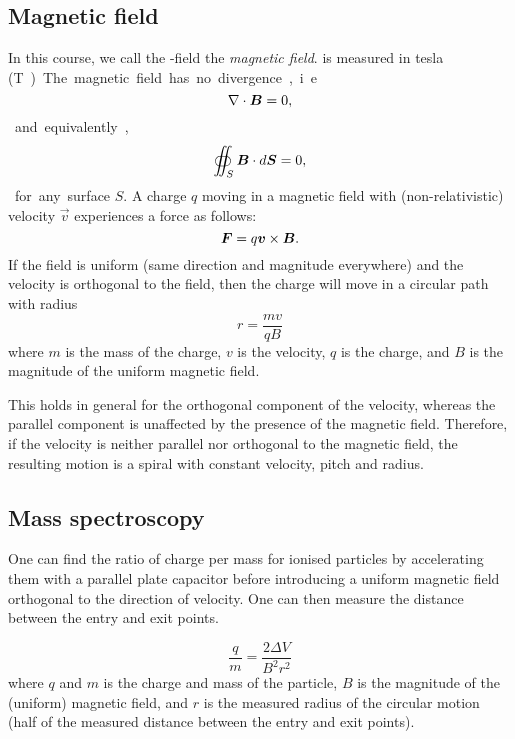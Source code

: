 \subsection{Magnetic field}
    In this course, we call the \B-field the \textit{magnetic field}. \B{} is measured in tesla (\si\tesla).
    
    The magnetic field has no divergence, i.e.
    \begin{equation}
        \nabla \cdot \bm{B} = 0,
    \end{equation}
    and equivalently,
    \begin{equation}
        \label{flux of B}
        \oiint_S \bm{B}\cdot d\bm{S} = 0,
    \end{equation}
    for any surface $S$.
    A charge $q$ moving in a magnetic field with (non-relativistic) velocity $\vec{v}$ experiences a force as follows: 
    \begin{equation}
        \bm{F} = q\bm{v}\times \bm{B}.
    \end{equation}
    If the field is uniform (same direction and magnitude everywhere) and the velocity is orthogonal to the field, 
    then the charge will move in a circular path with radius
    \begin{equation}
        r = \frac{mv}{qB}
    \end{equation}
    where $m$ is the mass of the charge, $v$ is the velocity, $q$ is the charge, 
    and $B$ is the magnitude of the uniform magnetic field.
    
    This holds in general for the orthogonal component of the velocity, 
    whereas the parallel component is unaffected by the presence of the magnetic field. 
    Therefore, if the velocity is neither parallel nor orthogonal to the magnetic field, 
    the resulting motion is a spiral with constant velocity, pitch and radius.
    
\subsection{Mass spectroscopy}
    One can find the ratio of charge per mass for ionised particles by accelerating them with a parallel plate capacitor 
    before introducing a uniform magnetic field orthogonal to the direction of velocity. 
    One can then measure the distance between the entry and exit points.
    
    \begin{equation}
        \frac{q}{m} = \frac{2 \Delta V}{B^2 r^2}
    \end{equation}
    where $q$ and $m$ is the charge and mass of the particle, $B$ is the magnitude of the (uniform) magnetic field, 
    and $r$ is the measured radius of the circular motion (half of the measured distance between the entry and exit points).
    
